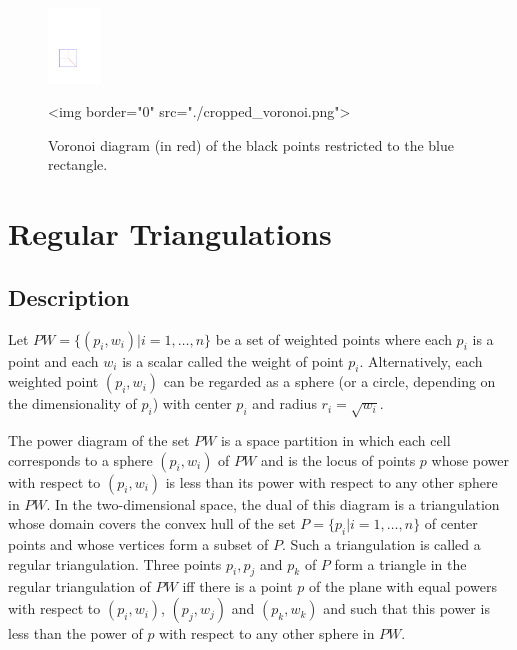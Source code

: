 \begin{figure}[ht]
\begin{center}
 \begin{ccTexOnly}
   \includegraphics[height=2cm]{Triangulation_2/cropped_voronoi}
 \end{ccTexOnly}
 \begin{ccHtmlOnly}
   <img border="0" src="./cropped_voronoi.png">
 \end{ccHtmlOnly}
   \label{figure:cropped_voronoi}
\end{center}
\caption{Voronoi diagram (in red) of the black points restricted to the blue rectangle.}
\end{figure}




\section{Regular Triangulations\label{Section_2D_Triangulations_Regular}}

\subsection{Description\label{Subsection_2D_Triangulations_Regular_Description}}
Let ${  PW} = \{(p_i, w_i) | i = 1, \ldots , n \}$ be a set of 
weighted points where each $p_i$ is a point and each $w_i$
is a scalar called the weight of point $p_i$.
Alternatively, each weighted point $(p_i, w_i)$ can be regarded
as a sphere (or a circle, depending on the dimensionality
of $p_i$)  with center $p_i$ and radius $r_i=\sqrt{w_i}$.

The power diagram of the set ${  PW}$ is a space partition in which
 each cell corresponds to a sphere $(p_i, w_i)$ of ${  PW}$
and is the locus of points  $p$ whose power with respect to $(p_i, w_i)$
is less than its power with respect to any other sphere 
in ${  PW}$. In the two-dimensional space,
the dual of this diagram is a triangulation 
whose domain covers the convex hull of the set 
${  P}= \{ p_i | i = 1, \ldots , n \}$ of center points
and whose vertices form a subset of ${  P}$.
Such a triangulation is called a regular triangulation.
Three points $p_i, p_j$ and $p_k$ of ${  P}$
form a triangle in the regular triangulation of ${  PW}$
iff there is a point $p$ of the plane with equal 
powers with respect to $(p_i, w_i)$, $(p_j, w_j)$
and $(p_k, w_k)$ and such that this power 
is  less than the power of $p$
with respect to any other sphere in  ${  PW}$.

